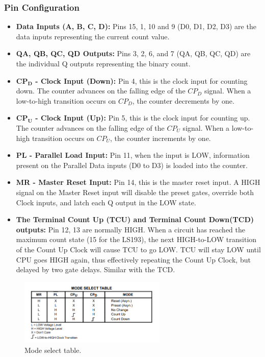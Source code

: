 \documentclass{article}
\begin{document}
\subsubsection{Pin Configuration}
\begin{itemize}
    \item \textbf{Data Inputs (A, B, C, D):} Pins 15, 1, 10 and 9 (D0, D1, D2, D3) are the data inputs representing the current count value.
    \item \textbf{QA, QB, QC, QD Outputs:} Pins 3, 2, 6, and 7 (QA, QB, QC, QD) are the individual Q outputs representing the binary count.
    \item \textbf{$\mathbf{CP_{D}}$ - Clock Input (Down):} Pin 4, this is the clock input for counting down. The counter advances on the falling edge of the $CP_D$ signal. When a low-to-high transition occurs on $CP_D$, the counter decrements by one.
    \item \textbf{$\mathbf{CP_{U}}$ - Clock Input (Up):} Pin 5, this is the clock input for counting up. The counter advances on the falling edge of the $CP_U$ signal. When a low-to-high transition occurs on $CP_U$, the counter increments by one.
    \item \textbf{PL - Parallel Load Input:} Pin 11, when the input is LOW, information present on the Parallel Data inputs (D0 to D3) is loaded into the counter.
    \item \textbf{MR - Master Reset Input:} Pin 14, this is the master reset input. A HIGH signal on the Master Reset input will disable the preset gates, override both Clock inputs, and latch each Q output in the LOW state.
    \item \textbf{The Terminal Count Up (TCU) and Terminal Count Down(TCD) outputs:} Pin 12, 13 are normally HIGH. When a circuit has reached the maximum count state (15 for the LS193), the next HIGH-to-LOW transition of the Count Up Clock will cause TCU to go LOW. TCU will stay LOW until CPU goes HIGH again, thus effectively repeating the Count Up Clock, but delayed by two gate delays. Similar with the TCD.
\end{itemize}


\begin{figure}[h]
    \centering
    \includegraphics[width=7cm]{Pic/Pictures/193N table.png}
    \caption{Mode select table.}
    \label{fig:enter-label}
\end{figure}
\end{document}

